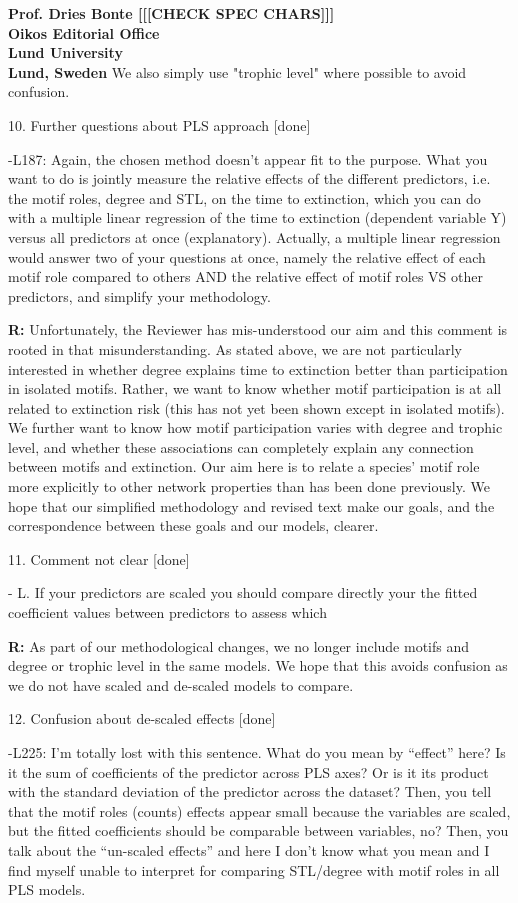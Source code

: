 \documentclass[12pt]{letter}
\begin{document}
\begin{letter}{\bf Prof. Dries Bonte [[[CHECK SPEC CHARS]]]\\
Oikos Editorial Office \\
Lund University \\
Lund, Sweden}
      We also simply use "trophic level" where possible to avoid confusion.

    10. Further questions about PLS approach [done]

        -L187: Again, the chosen method doesn't appear fit to the purpose. What you want to do is jointly measure the relative effects of the different predictors, i.e. the motif roles, degree and STL, on the time to extinction, which you can do with a multiple linear regression of the time to extinction (dependent variable Y) versus all predictors at once (explanatory). Actually, a multiple linear regression would answer two of your questions at once, namely the relative effect of each motif role compared to others AND the relative effect of motif roles VS other predictors, and simplify your methodology.
        
        \textbf{R:} Unfortunately, the Reviewer has mis-understood our aim and this comment is rooted in that misunderstanding.
        As stated above, we are not particularly interested in whether degree explains time to extinction better than participation in isolated motifs.
        Rather, we want to know whether motif participation is at all related to extinction risk (this has not yet been shown except in isolated motifs).
        We further want to know how motif participation varies with degree and trophic level, and whether these associations can completely explain any connection between motifs and extinction. 
        Our aim here is to relate a species' motif role more explicitly to other network properties than has been done previously.
        We hope that our simplified methodology and revised text make our goals, and the correspondence between these goals and our models, clearer.


    11. Comment not clear [done]
        
        - L. If your predictors are scaled you should compare directly your the fitted coefficient values between predictors to assess which
        
        \textbf{R:} As part of our methodological changes, we no longer include motifs and degree or trophic level in the same models. We hope that this avoids confusion as we do not have scaled and de-scaled models to compare.


    12. Confusion about de-scaled effects [done]

        -L225: I’m totally lost with this sentence. What do you mean by ``effect'' here? Is it the sum of coefficients of the predictor across PLS axes? Or is it its product with the standard deviation of the predictor across the dataset? Then, you tell that the motif roles (counts) effects appear small because the variables are scaled, but the fitted coefficients should be comparable between variables, no?  Then, you talk about the ``un-scaled effects'' and here I don’t know what you mean and I find myself unable to interpret for comparing STL/degree with motif roles in all PLS models.
        

\end{letter}
\end{document}
